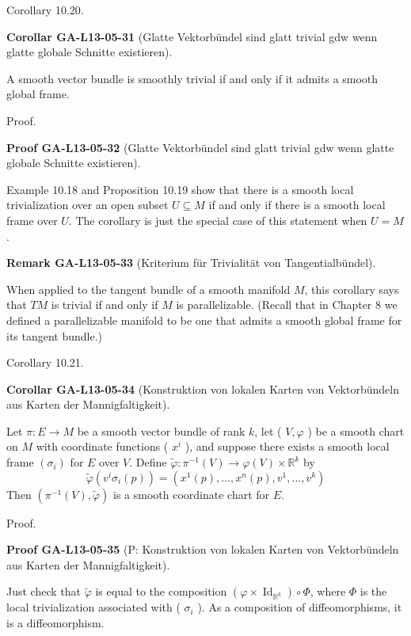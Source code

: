 \documentclass[10pt, letterpaper]{article}
\newcommand{\CustomHeading}[3]{%
  \par\medskip\noindent%
  \textbf{#1 #2} \textnormal{(#3)}.\enskip%
}
\newenvironment{KORO}[2]{\begin{unitbox}\CustomHeading{Corollar}{#1}{#2}}{\end{unitbox}}
\newenvironment{REM}[2]{\begin{unitbox}\CustomHeading{Remark}{#1}{#2}}{\end{unitbox}}
\newenvironment{PROOF}[2]{\begin{unitbox}\CustomHeading{Proof}{#1}{#2}}{\end{unitbox}}
\begin{document}
Corollary 10.20. 

\begin{KORO}{GA-L13-05-31}{Glatte Vektorbündel sind glatt trivial gdw wenn glatte globale Schnitte existieren}
A smooth vector bundle is smoothly trivial if and only if it admits a smooth global frame.
\end{KORO}

Proof. 

\begin{PROOF}{GA-L13-05-32}{Glatte Vektorbündel sind glatt trivial gdw wenn glatte globale Schnitte existieren}
Example 10.18 and Proposition 10.19 show that there is a smooth local trivialization over an open subset $U \subseteq M$ if and only if there is a smooth local frame over $U$. The corollary is just the special case of this statement when $U=M$.
\end{PROOF}



\begin{REM}{GA-L13-05-33}{Kriterium für Trivialität von Tangentialbündel}
When applied to the tangent bundle of a smooth manifold $M$, this corollary says that $T M$ is trivial if and only if $M$ is parallelizable. (Recall that in Chapter 8 we defined a parallelizable manifold to be one that admits a smooth global frame for its tangent bundle.)
\end{REM}



Corollary 10.21. 


\begin{KORO}{GA-L13-05-34}{Konstruktion von lokalen Karten von Vektorbündeln aus Karten der Mannigfaltigkeit}
Let $\pi: E \rightarrow M$ be a smooth vector bundle of rank $k$, let ( $V, \varphi$ ) be a smooth chart on $M$ with coordinate functions ( $x^{i}$ ), and suppose there exists a smooth local frame $\left(\sigma_{i}\right)$ for $E$ over $V$. Define $\tilde{\varphi}: \pi^{-1}(V) \rightarrow \varphi(V) \times \mathbb{R}^{k}$ by
$$
\widetilde{\varphi}\left(v^{i} \sigma_{i}(p)\right)=\left(x^{1}(p), \ldots, x^{n}(p), v^{1}, \ldots, v^{k}\right)
$$
Then $\left(\pi^{-1}(V), \widetilde{\varphi}\right)$ is a smooth coordinate chart for $E$.
\end{KORO}


Proof. 


\begin{PROOF}{GA-L13-05-35}{P: Konstruktion von lokalen Karten von Vektorbündeln aus Karten der Mannigfaltigkeit}
Just check that $\widetilde{\varphi}$ is equal to the composition $\left(\varphi \times \operatorname{Id}_{\mathbb{R}^{k}}\right) \circ \Phi$, where $\Phi$ is the local trivialization associated with ( $\sigma_{i}$ ). As a composition of diffeomorphisms, it is a diffeomorphism.
\end{PROOF}
\end{document}
